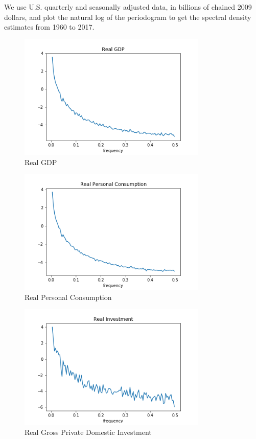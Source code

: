 \documentclass[letterpaper,11pt]{article}
\theoremstyle{definition}
\begin{document}
\begin{spacing}{1.5}
    \begin{Exercise} \label{Filter_HW_Periodograms}
        We use U.S. quarterly and seasonally adjusted data, in billions of chained 2009 dollars, and plot the natural log of the periodogram to get the spectral density estimates from 1960 to 2017.

				\begin{figure}[H]
					\caption{Real GDP}
					\label{fig:real_GDP}
					\includegraphics[width=0.8\textwidth]{Real_GDP_Periodogram.png}
				\end{figure}

				\begin{figure}[H]
					\caption{Real Personal Consumption}
					\label{fig:real_PC}
					\includegraphics[width=0.8\textwidth]{Real_PC_Periodogram.png}
				\end{figure}

				\begin{figure}[H]
					\caption{Real Gross Private Domestic Investment}
					\label{fig:real_IN}
					\includegraphics[width=0.8\textwidth]{Real_IN_Periodogram.png}
				\end{figure}


\end{Exercise}
\end{spacing}
\end{document}
